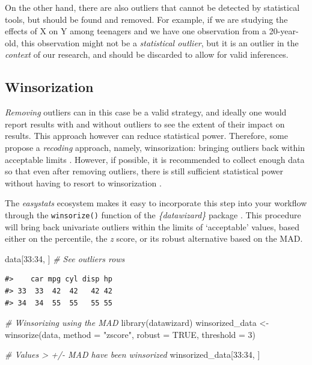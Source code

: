 \documentclass[mathematics,article,submit,moreauthors,pdftex]{mdpi}
\newenvironment{Shaded}{\begin{snugshade}}{\end{snugshade}}
\newcommand{\AttributeTok}[1]{\textcolor[rgb]{0.77,0.63,0.00}{#1}}
\newcommand{\CommentTok}[1]{\textcolor[rgb]{0.56,0.35,0.01}{\textit{#1}}}
\newcommand{\ConstantTok}[1]{\textcolor[rgb]{0.00,0.00,0.00}{#1}}
\newcommand{\DecValTok}[1]{\textcolor[rgb]{0.00,0.00,0.81}{#1}}
\newcommand{\FunctionTok}[1]{\textcolor[rgb]{0.00,0.00,0.00}{#1}}
\newcommand{\NormalTok}[1]{#1}
\newcommand{\OtherTok}[1]{\textcolor[rgb]{0.56,0.35,0.01}{#1}}
\newcommand{\SpecialCharTok}[1]{\textcolor[rgb]{0.00,0.00,0.00}{#1}}
\newcommand{\StringTok}[1]{\textcolor[rgb]{0.31,0.60,0.02}{#1}}
\begin{document}
On the other hand, there are also outliers that cannot be detected by
statistical tools, but should be found and removed. For example, if we
are studying the effects of X on Y among teenagers and we have one
observation from a 20-year-old, this observation might not be a
\emph{statistical outlier}, but it is an outlier in the \emph{context}
of our research, and should be discarded to allow for valid inferences.

\hypertarget{winsorization}{%
\subsection{Winsorization}\label{winsorization}}

\emph{Removing} outliers can in this case be a valid strategy, and
ideally one would report results with and without outliers to see the
extent of their impact on results. This approach however can reduce
statistical power. Therefore, some propose a \emph{recoding} approach,
namely, winsorization: bringing outliers back within acceptable limits
\citep[e.g., 3 MADs,][]{tukey1963less}. However, if possible, it is
recommended to collect enough data so that even after removing outliers,
there is still sufficient statistical power without having to resort to
winsorization \citep{leys2019outliers}.

The \emph{easystats} ecosystem makes it easy to incorporate this step
into your workflow through the \texttt{winsorize()} function of the
\emph{\{datawizard\}} package \citep{patil2022datawizard}. This
procedure will bring back univariate outliers within the limits of
`acceptable' values, based either on the percentile, the \emph{z} score,
or its robust alternative based on the MAD.

\begin{Shaded}
\begin{Highlighting}[]
\NormalTok{data[}\DecValTok{33}\SpecialCharTok{:}\DecValTok{34}\NormalTok{, ]  }\CommentTok{\# See outliers rows}
\end{Highlighting}
\end{Shaded}

\begin{verbatim}
#>    car mpg cyl disp hp
#> 33  33  42  42   42 42
#> 34  34  55  55   55 55
\end{verbatim}

\begin{Shaded}
\begin{Highlighting}[]
\CommentTok{\# Winsorizing using the MAD}
\FunctionTok{library}\NormalTok{(datawizard)}
\NormalTok{winsorized\_data }\OtherTok{\textless{}{-}} \FunctionTok{winsorize}\NormalTok{(data, }\AttributeTok{method =} \StringTok{"zscore"}\NormalTok{, }\AttributeTok{robust =} \ConstantTok{TRUE}\NormalTok{, }\AttributeTok{threshold =} \DecValTok{3}\NormalTok{)}

\CommentTok{\# Values \textgreater{} +/{-} MAD have been winsorized}
\NormalTok{winsorized\_data[}\DecValTok{33}\SpecialCharTok{:}\DecValTok{34}\NormalTok{, ]}
\end{Highlighting}
\end{Shaded}
\end{document}
